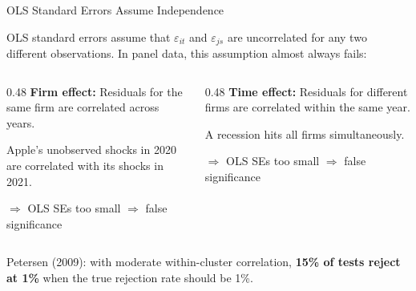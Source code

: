 \documentclass[9pt,aspectratio=169]{beamer}
\begin{document}
\begin{frame}{OLS Standard Errors Assume Independence}

OLS standard errors assume that $\varepsilon_{it}$ and $\varepsilon_{js}$ are uncorrelated for any two different observations. In panel data, this assumption almost always fails:

\bigskip

\begin{columns}[T]
\begin{column}{0.48\textwidth}
\textbf{Firm effect:} Residuals for the same firm are correlated across years.

\medskip

{\small Apple's unobserved shocks in 2020 are correlated with its shocks in 2021.}

\medskip

$\Rightarrow$ OLS SEs too small $\Rightarrow$ false significance
\end{column}
\begin{column}{0.48\textwidth}
\textbf{Time effect:} Residuals for different firms are correlated within the same year.

\medskip

{\small A recession hits all firms simultaneously.}

\medskip

$\Rightarrow$ OLS SEs too small $\Rightarrow$ false significance
\end{column}
\end{columns}

\bigskip

\begin{highlightbox}
\centering
Petersen (2009): with moderate within-cluster correlation, \textbf{15\% of tests reject at 1\%} when the true rejection rate should be 1\%.
\end{highlightbox}

\end{frame}
\end{document}
